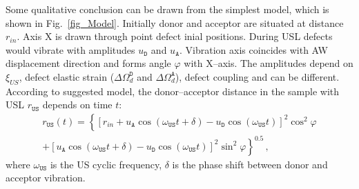 \documentclass[aip,jap, amsmath,amssymb,reprint]{revtex4-1}
\begin{document}
Some qualitative conclusion can be drawn from the simplest model, which is shown in Fig.~\ref{fig_Model}.
Initially donor and acceptor are situated at distance $r_{in}$.
Axis X is drawn through point defect inial positions.
During USL defects would vibrate with amplitudes $u_\mathtt{D}$ and $u_\mathtt{A}$.
Vibration axis coincides with AW displacement direction and forms angle $\varphi$ with  X--axis.
The amplitudes depend on $\xi_{U\!S}$, defect elastic strain ($\Delta\Omega_d^\mathtt{D}$ and $\Delta\Omega_d^\mathtt{A}$), defect coupling  and can be different.
According to suggested model, the donor--acceptor distance in the sample with USL $r_\mathtt{US}$ depends on time $t$:
\begin{multline}
\label{eqrUS}
r_\mathtt{US}(t)=\left\{[r_{in}+u_\mathtt{A}\cos(\omega_\mathtt{US}t+\delta)-u_\mathtt{D}\cos(\omega_\mathtt{US}t)]^2\cos^2\varphi \right.\\
    \left.+ [u_\mathtt{A}\cos(\omega_\mathtt{US}t+\delta)-u_\mathtt{D}\cos(\omega_\mathtt{US}t)]^2\sin^2\varphi\right\}^{0.5}\,,
\end{multline}
where $\omega_\mathtt{US}$ is the US cyclic frequency,
$\delta$ is the phase shift between donor and acceptor vibration.
\end{document}
